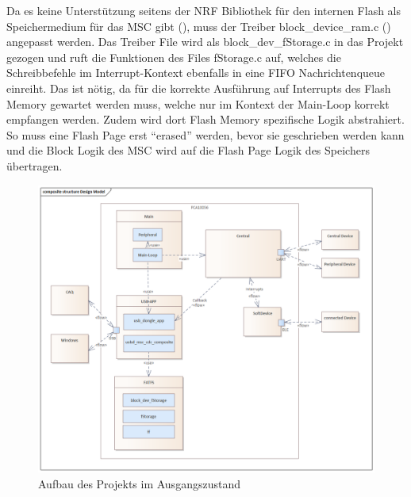 Da es keine Unterstützung seitens der NRF Bibliothek für den internen Flash als Speichermedium für das \ac{MSC} gibt (\cite{NRF_MSC_Forum}), muss der Treiber block\_device\_ram.c (\cite{NRF_Block_device_RAM}) angepasst werden. Das Treiber File wird als block\_dev\_fStorage.c in das Projekt gezogen und ruft die Funktionen des Files fStorage.c auf, welches die Schreibbefehle im Interrupt-Kontext ebenfalls in eine \ac{FIFO} Nachrichtenqueue einreiht. Das ist nötig, da für die korrekte Ausführung auf Interrupts des Flash Memory gewartet werden muss, welche nur im Kontext der Main-Loop korrekt empfangen werden. Zudem wird dort Flash Memory spezifische Logik abstrahiert. So muss eine Flash Page erst ``erased'' werden, bevor sie geschrieben werden kann und die Block Logik des \ac{MSC} wird auf die Flash Page Logik des Speichers übertragen.

\begin{figure}[H] 
	\centering
	\includegraphics[width=\textwidth]{figures/Design_Model.png}
	\caption{Aufbau des Projekts im Ausgangszustand}
	\label{fig:AufbauAusgangszustand}
\end{figure}



